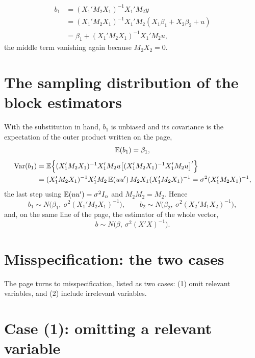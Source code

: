 \documentclass[11pt]{article}
\begin{document}
\[
\begin{aligned}
b_{1} &= (X_{1}'M_{2}X_{1})^{-1}X_{1}'M_{2}y\\
      &= (X_{1}'M_{2}X_{1})^{-1}X_{1}'M_{2}(X_{1}\beta_{1} + X_{2}\beta_{2} + u)\\
      &= \beta_{1} + (X_{1}'M_{2}X_{1})^{-1}X_{1}'M_{2}u,
\end{aligned}
\]
the middle term vanishing again because $M_{2}X_{2} = 0$.

\section{The sampling distribution of the block estimators}

With the substitution in hand, $b_{1}$ is unbiased and its covariance is the
expectation of the outer product written on the page,
\[ \mathbb{E}(b_{1}) = \beta_{1}, \]
\[
\begin{aligned}
\operatorname{Var}(b_{1}) &= \mathbb{E}\Bigl\{(X_{1}'M_{2}X_{1})^{-1}X_{1}'M_{2}u
              \bigl[(X_{1}'M_{2}X_{1})^{-1}X_{1}'M_{2}u\bigr]'\Bigr\}\\
            &= (X_{1}'M_{2}X_{1})^{-1}X_{1}'M_{2}\,\mathbb{E}(uu')\,M_{2}X_{1}(X_{1}'M_{2}X_{1})^{-1}
             = \sigma^{2}(X_{1}'M_{2}X_{1})^{-1},
\end{aligned}
\]
the last step using $\mathbb{E}(uu') = \sigma^{2}I_{n}$ and $M_{2}M_{2} = M_{2}$. Hence
\[ b_{1} \sim N\bigl(\beta_{1},\ \sigma^{2}(X_{1}'M_{2}X_{1})^{-1}\bigr), \qquad
   b_{2} \sim N\bigl(\beta_{2},\ \sigma^{2}(X_{2}'M_{1}X_{2})^{-1}\bigr), \]
and, on the same line of the page, the estimator of the whole vector,
\[ b \sim N\bigl(\beta,\ \sigma^{2}(X'X)^{-1}\bigr). \]

\section{Misspecification: the two cases}

The page turns to misspecification, listed as two cases: (1) omit relevant
variables, and (2) include irrelevant variables.

\section{Case (1): omitting a relevant variable}
\end{document}
